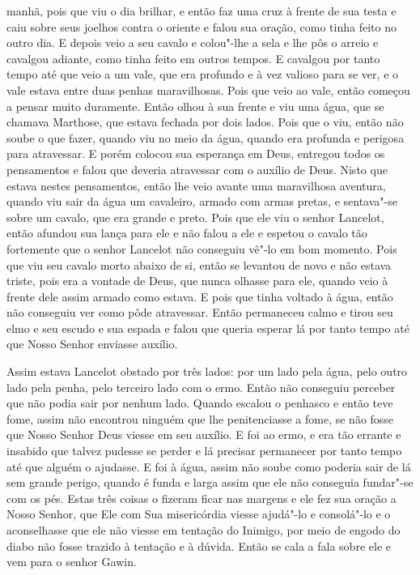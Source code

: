 manhã, pois que viu o dia brilhar, e então faz uma cruz à frente de sua testa e
caiu sobre seus joelhos contra o oriente e falou sua oração, como tinha feito
no outro dia. E depois veio a seu cavalo e colou"-lhe a sela e lhe pôs o arreio
e cavalgou adiante, como tinha feito em outros tempos. E cavalgou por tanto
tempo até que veio a um vale, que era profundo e à vez valioso para se ver, e o
vale estava entre duas penhas maravilhosas. Pois que veio ao vale, então
começou a pensar muito duramente. Então olhou à sua frente e viu uma água, que
se chamava Marthose, que estava fechada por dois lados. Pois que o viu, então
não soube o que fazer, quando viu no meio da água,  quando era profunda e
perigosa para atravessar. E porém colocou sua esperança em Deus, entregou todos
os pensamentos e falou que deveria atravessar com o auxílio de Deus. Nisto que
estava nestes pensamentos, então lhe veio avante uma maravilhosa aventura,
quando viu sair da água um cavaleiro, armado com armas pretas, e sentava"-se
sobre um cavalo, que era grande e preto. Pois que ele viu o senhor Lancelot,
então afundou sua lança para ele e não falou a ele e espetou o cavalo tão
fortemente que o senhor Lancelot não conseguiu vê"-lo em bom momento. Pois que
viu seu cavalo morto abaixo de si, então se levantou de novo e não estava
triste, pois era a vontade de Deus, que nunca olhasse para ele, quando veio à
frente dele assim armado como estava. E pois que tinha voltado à água, então
não conseguiu ver como pôde atravessar. Então permaneceu calmo e tirou seu elmo
e seu escudo e sua espada e falou que queria esperar lá por tanto tempo até que
Nosso Senhor enviasse auxílio.

Assim estava Lancelot obstado por três lados: por um lado pela água, pelo outro
lado pela penha, pelo terceiro lado com o ermo. Então não conseguiu perceber
que não podia sair por nenhum lado. Quando escalou o penhasco e então teve
fome, assim não encontrou ninguém que lhe penitenciasse a fome, se não fosse
que Nosso Senhor Deus viesse em seu auxílio. E foi ao ermo, e era tão errante e
insabido que talvez pudesse se perder e lá precisar permanecer por tanto tempo
até que alguém o ajudasse. E foi à água, assim não soube como poderia sair de
lá sem grande perigo, quando é funda e larga assim que ele não conseguia
fundar"-se com os pés. Estas três coisas o fizeram ficar nas margens e ele fez
sua oração a Nosso Senhor, que Ele com Sua misericórdia viesse ajudá"-lo e
consolá"-lo e o aconselhasse que ele não viesse em tentação do Inimigo, por meio
de engodo do diabo não fosse trazido à tentação e à dúvida. Então se cala a
fala sobre ele e vem para o senhor Gawin.

